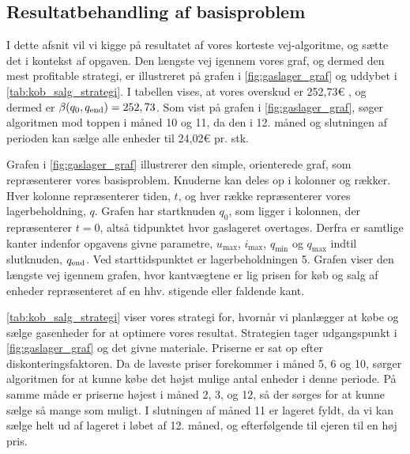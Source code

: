 \subsection{Resultatbehandling af basisproblem}

I dette afsnit vil vi kigge på resultatet af vores korteste vej-algoritme, og sætte det i kontekst af opgaven. Den længste vej igennem vores graf, og dermed den mest profitable strategi, er illustreret på grafen i \autoref{fig:gaslager_graf} og uddybet i \autoref{tab:kob_salg_strategi}. I tabellen vises, at vores overskud er 252,73€ %
, og dermed er $\beta (q_0, q_{\textrm{end}}) = 252,73$. Som vist på grafen i \autoref{fig:gaslager_graf}, søger algoritmen mod toppen i måned 10 og 11, da den i 12. måned og slutningen af perioden kan sælge alle enheder til 24,02€ pr. stk. 



Grafen i \autoref{fig:gaslager_graf} illustrerer den simple, orienterede graf, som repræsenterer vores basisproblem. Knuderne kan deles op i kolonner og rækker. Hver kolonne repræsenterer tiden, $t$, og hver række repræsenterer vores lagerbeholdning, $q$. Grafen har startknuden $q_0$, som ligger i kolonnen, der repræsenterer $t=0$, altså tidpunktet hvor gaslageret overtages. Derfra er samtlige kanter indenfor opgavens givne parametre, $u_{\max }$, $i_{\max }$, $q_{\min }$ og $q_{\max }$ indtil slutknuden, $q_{\textrm{end}}$. Ved starttidspunktet er lagerbeholdningen 5. Grafen viser den længste vej igennem grafen, hvor kantvægtene er lig prisen for køb og salg af enheder repræsenteret af en hhv. stigende eller faldende kant.



\autoref{tab:kob_salg_strategi} viser vores strategi for, hvornår vi planlægger at købe og sælge gasenheder for at optimere vores resultat. Strategien tager udgangspunkt i \autoref{fig:gaslager_graf} og det givne materiale. Priserne er sat op efter diskonteringsfaktoren.%
 Da de laveste priser forekommer i måned 5, 6 og 10, sørger algoritmen for at kunne købe det højst mulige antal enheder i denne periode. På samme måde er priserne højest i måned 2, 3, og 12, så der sørges for at kunne sælge så mange som muligt. I slutningen af måned 11 er lageret fyldt, da vi kan sælge helt ud af lageret i løbet af 12. måned, og efterfølgende til ejeren til en høj pris.

